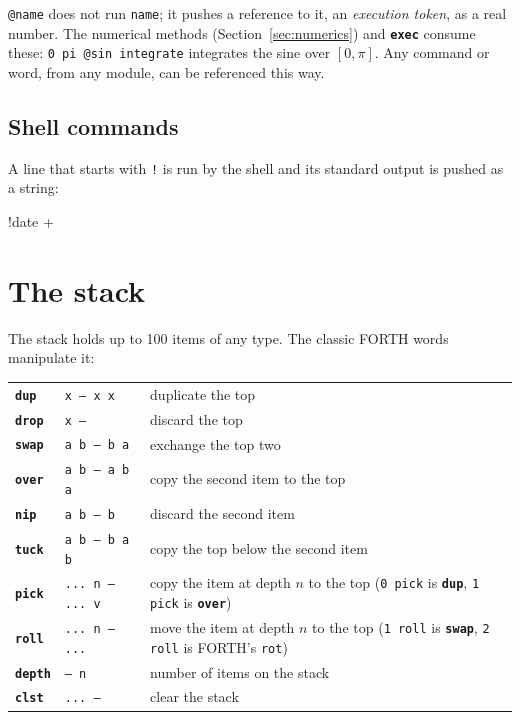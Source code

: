\documentclass[11pt,letterpaper]{article}
\newcommand{\code}[1]{\texttt{#1}}
\newcommand{\cmd}[1]{\texttt{\textbf{#1}}}
\newcommand{\stk}[1]{\texttt{#1}}
\begin{document}
\code{@name} does not run \code{name}; it pushes a reference to it, an \emph{execution token}, as a real number. The numerical methods (Section~\ref{sec:numerics}) and \cmd{exec} consume these: \code{0 pi @sin integrate} integrates the sine over $[0,\pi]$. Any command or word, from any module, can be referenced this way.

\subsection{Shell commands}

A line that starts with \code{!} is run by the shell and its standard output is pushed as a string:
\begin{rpn}
!date +%
\end{rpn}

\section{The stack}

The stack holds up to 100 items of any type. The classic FORTH words manipulate it:

\begin{center}
\begin{tabular}{@{}llp{}@{}}
\toprule
\cmd{dup}  & \stk{x -- x x}     & duplicate the top \\
\cmd{drop} & \stk{x --}         & discard the top \\
\cmd{swap} & \stk{a b -- b a}   & exchange the top two \\
\cmd{over} & \stk{a b -- a b a} & copy the second item to the top \\
\cmd{nip}  & \stk{a b -- b}     & discard the second item \\
\cmd{tuck} & \stk{a b -- b a b} & copy the top below the second item \\
\cmd{pick} & \stk{... n -- ... v} & copy the item at depth $n$ to the top (\code{0 pick} is \cmd{dup}, \code{1 pick} is \cmd{over}) \\
\cmd{roll} & \stk{... n -- ...}   & move the item at depth $n$ to the top (\code{1 roll} is \cmd{swap}, \code{2 roll} is FORTH's \code{rot}) \\
\cmd{depth} & \stk{-- n}        & number of items on the stack \\
\cmd{clst} & \stk{... --}       & clear the stack \\
\bottomrule
\end{tabular}
\end{center}
\end{document}
